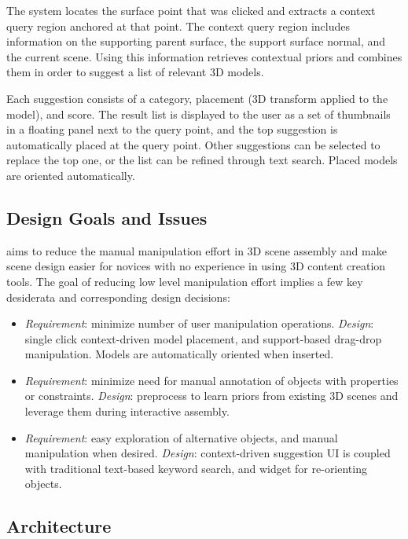 \documentclass{sigchi}
\begin{document}
The system locates the surface point that was clicked and extracts a context query region anchored at that point.  The context query region includes information on the supporting parent surface, the support surface normal, and the current scene.  Using this information \SceneSuggest retrieves contextual priors and combines them in order to suggest a list of relevant 3D models.

Each suggestion consists of a category, placement (3D transform applied to the model), and score.  The result list is displayed to the user as a set of thumbnails in a floating panel next to the query point, and the top suggestion is automatically placed at the query point.  Other suggestions can be selected to replace the top one, or the list can be refined through text search.  Placed models are oriented automatically.


\subsection{Design Goals and Issues}

\SceneSuggest aims to reduce the manual manipulation effort in 3D scene assembly and make scene design easier for novices with no experience in using 3D content creation tools.  The goal of reducing low level manipulation effort implies a few key desiderata and corresponding design decisions:

\begin{itemize}[noitemsep]
\item{\emph{Requirement}: minimize number of user manipulation operations.  \emph{Design}: single click context-driven model placement, and support-based drag-drop manipulation.  Models are automatically oriented when inserted.}

\item{\emph{Requirement}: minimize need for manual annotation of objects with properties or constraints.  \emph{Design}: preprocess to learn priors from existing 3D scenes and leverage them during interactive assembly.}

\item{\emph{Requirement}: easy exploration of alternative objects, and manual manipulation when desired.  \emph{Design}: context-driven suggestion UI is coupled with traditional text-based keyword search, and widget for re-orienting objects.}
\end{itemize}

\subsection{Architecture}
\end{document}
